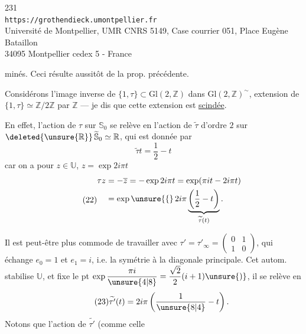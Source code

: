 
\begin{center}
231\\
\texttt{https://grothendieck.umontpellier.fr}\\
Université de Montpellier, UMR CNRS 5149, Case courrier 051, Place Eugène Bataillon\\
34095 Montpellier cedex 5 - France
\end{center}


minés. Ceci résulte 
aussitôt de la prop. précédente.

 Considérons l'image inverse de $\{1,\tau\}\subset\mathrm{Gl}(2,\mathbb Z)$
dans $\mathrm{Gl}(2,\mathbb Z)^{\sim}$,
 extension de
$\{1,\tau\}\simeq\mathbb Z/2\mathbb Z$ par $\mathbb Z$
--- je dis que cette extension est \uline{scindée}.


En effet, l'action de $\tau$ sur $\mathbb S_0$
se relève en l'action de $\widetilde\tau$ 
d'ordre $2$ sur
$\deleted{\unsure{\mathbb R}}\,
\widetilde{\mathbb S}_0\simeq\mathbb R$,
qui est donnée par
\[
\tag{21}
\widetilde\tau t=\frac12-t
\]
car on a pour $z\in\mathbb U$, $z=\exp 2i\pi t$
\[
\tag{22}
\begin{aligned}
\tau z&=-\overline z=-\exp 2i\pi t
=\exp(\pi it-2i\pi t)\\
&=\exp\unsure{\{}\,2i\pi
\underbrace{\left(\frac12-t\right)}_{\widetilde\tau(t)}.
\end{aligned}
\]

 Il est peut-être plus commode de travailler avec
$\tau'=\tau'_\infty=\begin{pmatrix}0&1\\1&0\end{pmatrix}$,
qui  échange $e_0=1$ et $e_1=i$,
i.e. la symétrie  à la diagonale principale.
Cet autom. stabilise $\mathbb U$, et fixe le pt
$\exp\dfrac{\pi i}{\unsure{4|8}}=\dfrac{\sqrt2}{2}(i+1)\unsure{)}$,
il se relève en
\[
\tag{23}
\widetilde{\tau'}(t)=2i\pi\left(\frac1{\unsure{8|4}}-t\right).
\]
Notons que 
l'action de $\widetilde{\tau'}$ (comme celle

